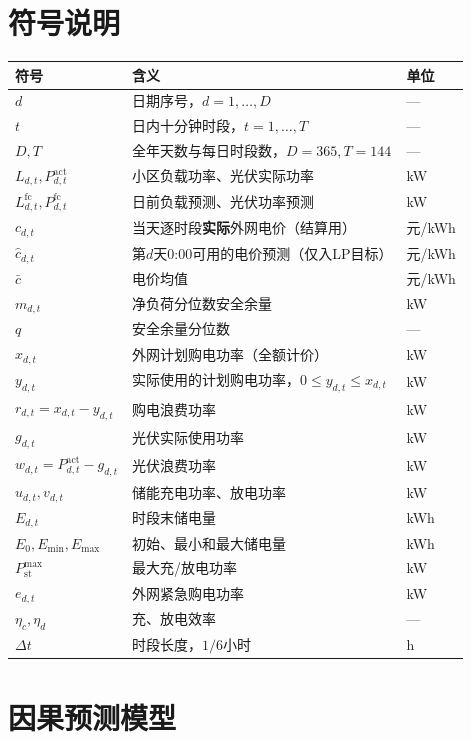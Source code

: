 \documentclass[UTF8,12pt]{ctexart}
\begin{document}
\section{符号说明}
\begin{table}[H]\centering\small
\begin{tabular}{lll}\toprule
符号 & 含义 & 单位\\\midrule
$d$ & 日期序号，$d=1,\ldots,D$ & ---\\
$t$ & 日内十分钟时段，$t=1,\ldots,T$ & ---\\
$D,T$ & 全年天数与每日时段数，$D=365,T=144$ & ---\\
$L_{d,t},P_{d,t}^{\mathrm{act}}$ & 小区负载功率、光伏实际功率 & kW\\
$L_{d,t}^{\mathrm{fc}},P_{d,t}^{\mathrm{fc}}$ & 日前负载预测、光伏功率预测 & kW\\
$c_{d,t}$ & 当天逐时段\textbf{实际}外网电价（结算用） & 元/kWh\\
$\hat c_{d,t}$ & 第$d$天0:00可用的电价预测（仅入LP目标） & 元/kWh\\
$\bar c$ & 电价均值 & 元/kWh\\
$m_{d,t}$ & 净负荷分位数安全余量 & kW\\
$q$ & 安全余量分位数 & ---\\
$x_{d,t}$ & 外网计划购电功率（全额计价） & kW\\
$y_{d,t}$ & 实际使用的计划购电功率，$0\le y_{d,t}\le x_{d,t}$ & kW\\
$r_{d,t}=x_{d,t}-y_{d,t}$ & 购电浪费功率 & kW\\
$g_{d,t}$ & 光伏实际使用功率 & kW\\
$w_{d,t}=P_{d,t}^{\mathrm{act}}-g_{d,t}$ & 光伏浪费功率 & kW\\
$u_{d,t},v_{d,t}$ & 储能充电功率、放电功率 & kW\\
$E_{d,t}$ & 时段末储电量 & kWh\\
$E_0,E_{\min},E_{\max}$ & 初始、最小和最大储电量 & kWh\\
$P_{\mathrm{st}}^{\max}$ & 最大充/放电功率 & kW\\
$e_{d,t}$ & 外网紧急购电功率 & kW\\
$\eta_c,\eta_d$ & 充、放电效率 & ---\\
$\Delta t$ & 时段长度，$1/6$小时 & h\\\bottomrule
\end{tabular}
\end{table}

\section{因果预测模型}
\end{document}
